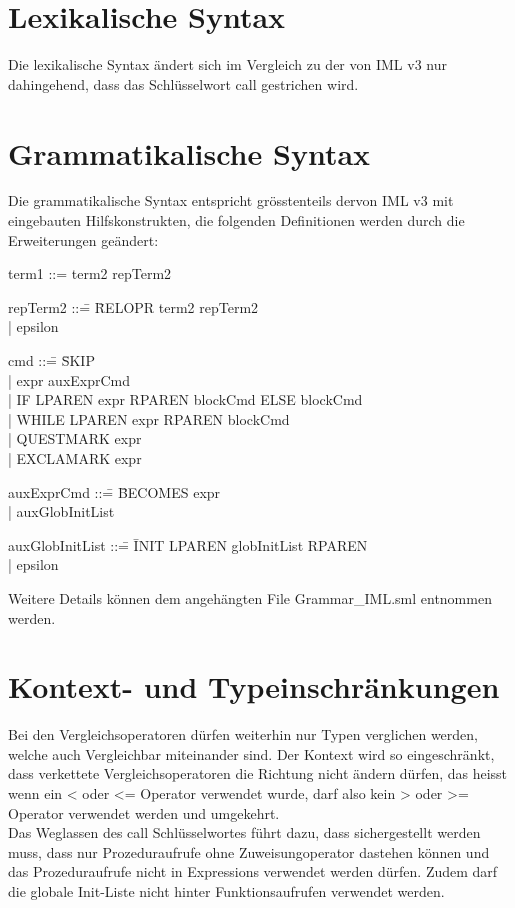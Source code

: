 \documentclass[a4paper,10pt]{article}
\begin{document}
\section{Lexikalische Syntax}
Die lexikalische Syntax \"andert sich im Vergleich zu der von IML v3
nur dahingehend, dass das Schl\"usselwort call gestrichen wird.
\section{Grammatikalische Syntax}
Die grammatikalische Syntax entspricht gr\"osstenteils dervon IML v3 mit eingebauten Hilfskonstrukten, die folgenden Definitionen werden durch die Erweiterungen ge\"andert:

\begin{tabbing}
term1 ::= term2 repTerm2
\end{tabbing}
\begin{tabbing}
repTerm2 ::\= = \= RELOPR term2 repTerm2\\
\> |\> epsilon
\end{tabbing}
\begin{tabbing}
cmd ::\= = \= SKIP\\
\> |\> expr auxExprCmd\\
\> |\> IF LPAREN expr RPAREN blockCmd ELSE blockCmd\\
\> |\> WHILE LPAREN expr RPAREN blockCmd\\
\> |\> QUESTMARK expr\\
\> |\> EXCLAMARK expr\\
\end{tabbing}
\begin{tabbing}
auxExprCmd ::\= = \= BECOMES expr\\
\> |\> auxGlobInitList\\
\end{tabbing}
\begin{tabbing}
auxGlobInitList ::\= = \= INIT LPAREN globInitList RPAREN\\
\> |\> epsilon\\
\end{tabbing}
Weitere Details k\"onnen dem angeh\"angten File Grammar\_IML.sml entnommen werden. 
\section{Kontext- und Typeinschr\"ankungen}
Bei den Vergleichsoperatoren dürfen weiterhin nur Typen verglichen werden, welche auch Vergleichbar miteinander sind. Der Kontext wird so
eingeschränkt, dass verkettete Vergleichsoperatoren die Richtung nicht \"andern d\"urfen, das heisst wenn ein < oder <= Operator verwendet wurde, darf also kein > oder >= Operator verwendet werden und umgekehrt.\\
Das Weglassen des call Schl\"usselwortes führt dazu, dass
sichergestellt werden muss, dass nur Prozeduraufrufe ohne 
Zuweisungoperator dastehen k\"onnen und das Prozeduraufrufe nicht in
Expressions verwendet werden d\"urfen. Zudem darf die globale
Init-Liste nicht hinter Funktionsaufrufen verwendet werden. 
\end{document}
